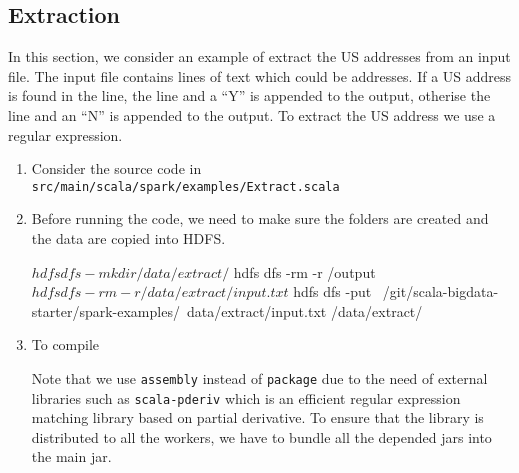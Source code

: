 \documentclass[10pt]{article}
\begin{document}
\subsection{Extraction}
In this section, we consider an example of extract the US addresses from an input file.
The input file contains lines of text which could be addresses. If a US address is found in the line, the line and a ``Y'' is appended to the output, otherise the line and  an ``N'' is appended to the output.
To extract the US address we use a regular expression.
\begin{enumerate}
\item Consider the source code in {\tt src/main/scala/spark/examples/Extract.scala}
\item Before running the code, we need to make sure the folders are created and the data are copied into HDFS.
\begin{code}
$ hdfs dfs -mkdir /data/extract/
$ hdfs dfs -rm -r /output
$ hdfs dfs -rm -r /data/extract/input.txt
$ hdfs dfs -put ~/git/scala-bigdata-starter/spark-examples/\
data/extract/input.txt /data/extract/
\end{code}

\item To compile
Note that we use {\tt assembly} instead of {\tt package} due to the need of external libraries such as 
{\tt scala-pderiv} which is an efficient regular expression matching library based on partial derivative.
To ensure that the library is distributed to all the workers, we have to bundle all the depended jars into 
the main jar.


\end{enumerate}
\end{document}
